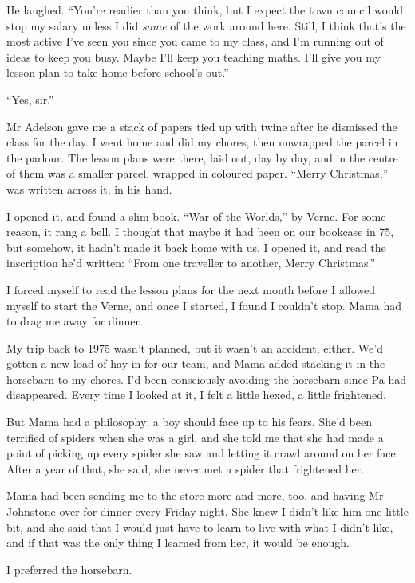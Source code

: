 He laughed.
``You're readier than you think, but I expect the town council would stop my 
salary unless I did \emph{some} of the work around here. Still, I think that's 
the most active I've seen you since you came to my class, and I'm running out 
of ideas to keep you busy. Maybe I'll keep you teaching maths. I'll give you my 
lesson plan to take home before school's out.''

``Yes, sir.''

\tb

Mr Adelson gave me a stack of papers tied up with twine after he
dismissed the class for the day. I went home and did my chores,
then unwrapped the parcel in the parlour. The lesson plans were
there, laid out, day by day, and in the centre of them was a
smaller parcel, wrapped in coloured paper. ``Merry Christmas,'' was
written across it, in his hand.

I opened it, and found a slim book. ``War of the Worlds,'' by
Verne. For some reason, it rang a bell. I thought that maybe it had
been on our bookcase in 75, but somehow, it hadn't made it back
home with us. I opened it, and read the inscription he'd written:
``From one traveller to another, Merry Christmas.''

I forced myself to read the lesson plans for the next month before
I allowed myself to start the Verne, and once I started, I found I
couldn't stop. Mama had to drag me away for dinner.

\tb

My trip back to 1975 wasn't planned, but it wasn't an accident,
either. We'd gotten a new load of hay in for our team, and Mama
added stacking it in the horsebarn to my chores. I'd been
consciously avoiding the horsebarn since Pa had disappeared. Every
time I looked at it, I felt a little hexed, a little frightened.

But Mama had a philosophy: a boy should face up to his fears. She'd
been terrified of spiders when she was a girl, and she told me that
she had made a point of picking up every spider she saw and letting
it crawl around on her face. After a year of that, she said, she
never met a spider that frightened her.

Mama had been sending me to the store more and more, too, and
having Mr Johnstone over for dinner every Friday night. She knew I
didn't like him one little bit, and she said that I would just have
to learn to live with what I didn't like, and if that was the only
thing I learned from her, it would be enough.

I preferred the horsebarn.

